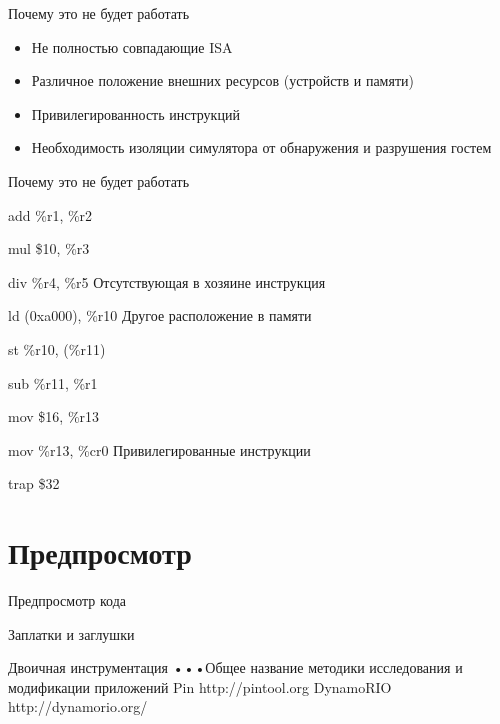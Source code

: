 \documentclass{beamer}
\begin{document}
\begin{frame}{Почему это не будет работать}
\begin{itemize}
\item Не полностью совпадающие ISA

\item Различное положение внешних ресурсов
(устройств и памяти)

\item Привилегированность инструкций

\item Необходимость изоляции симулятора от
обнаружения и разрушения гостем

\end{itemize}
\end{frame}

\begin{frame}{Почему это не будет работать}


add \%r1, \%r2

mul \$10, \%r3

div \%r4, \%r5 Отсутствующая в хозяине инструкция

ld (0xa000), \%r10 Другое расположение в памяти

st \%r10, (\%r11)

sub \%r11, \%r1

mov \$16, \%r13

mov \%r13, \%cr0 Привилегированные инструкции

trap \$32


\end{frame}

\section{Предпросмотр}

\begin{frame}{Предпросмотр кода}

\end{frame}


\begin{frame}{Заплатки и заглушки}

\end{frame}

\begin{frame}{Двоичная инструментация}
•••Общее название методики
исследования и модификации
приложений
Pin http://pintool.org
DynamoRIO http://dynamorio.org/

\end{frame}
\end{document}
